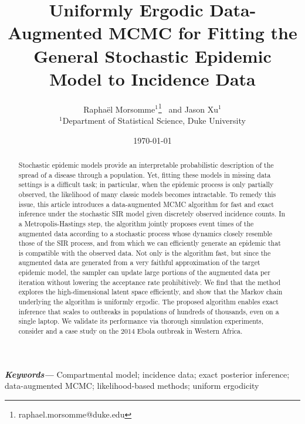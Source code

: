 \documentclass[11pt]{article}
\begin{document}
	
	\providecommand{\keywords}[1]
	{
		\small	
		\textbf{\textit{Keywords---}} #1
	}
	
	
	\title{%
		Uniformly Ergodic Data-Augmented MCMC for Fitting the General Stochastic Epidemic Model to Incidence Data}
	\author{Rapha\"{e}l Morsomme$^{1}$\footnote{raphael.morsomme@duke.edu} \ and Jason Xu$^{1}$ \\
		\small $^{1}$Department of Statistical Science, Duke University \\
	}
	\date{\today}	
	\maketitle
	
	\begin{abstract}
		Stochastic epidemic models provide an interpretable probabilistic description of the spread of a disease through a population. Yet, fitting these models in missing data settings is a difficult task; in particular, when the epidemic process is only partially observed, the likelihood of many classic models becomes intractable. To remedy this issue, this article introduces a data-augmented MCMC algorithm for fast and exact inference under the stochastic SIR model given discretely observed incidence counts. In a Metropolis-Hastings step, the algorithm jointly proposes event times of the augmented data according to a stochastic process whose dynamics closely resemble those of the SIR process, and from which we can efficiently generate an epidemic that is compatible with the observed data. Not only is the algorithm fast, but since the augmented data are generated from a very faithful approximation of the target epidemic model, the sampler can update large portions of the augmented data per iteration without lowering the acceptance rate prohibitively. We find that the method explores the high-dimensional latent space efficiently, and show that the Markov chain underlying the algorithm is uniformly ergodic. %
		The proposed algorithm enables exact inference that scales to outbreaks in populations of hundreds of thousands, even on a single laptop. We validate its performance via thorough simulation experiments, consider and a case study on the $2014$ Ebola outbreak in Western Africa. %
	\end{abstract}
	\keywords{Compartmental model; incidence data; exact posterior inference; data-augmented MCMC; likelihood-based methods; uniform ergodicity}
	
\end{document}
